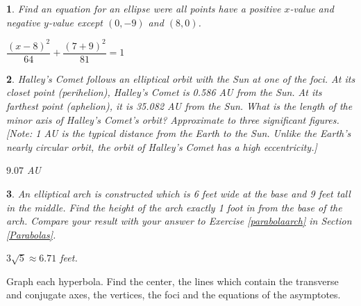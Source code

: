 \documentclass{amsbook}
\newtheorem{exc}{}
\newenvironment{ex}{\begin{exc}\normalfont}{\end{exc}}
\numberwithin{section}{chapter}
\numberwithin{equation}{chapter}
\begin{document}
\begin{ex}
	Find an equation for an ellipse were all points have a positive $x$-value and negative $y$-value \textit{except} $(0,-9)$ and $(8,0)$.
	\begin{sol}
				$\dfrac{(x-8)^2}{64}+\dfrac{(7+9)^2}{81} = 1$
	\end{sol}
\end{ex}



\begin{ex}
Halley's Comet follows an elliptical orbit with the Sun at one of the foci. At its closet point (perihelion), Halley's Comet is 	0.586 AU from the Sun. At its farthest point (aphelion), it is 35.082 AU from the Sun. What is the length of the minor axis of Halley's Comet's orbit? Approximate to three significant figures. [Note: 1 AU is the typical distance from the Earth to the Sun. Unlike the Earth's nearly circular orbit, the orbit of Halley's Comet has a high \textit{eccentricity}.]


\begin{sol}
	$9.07$ AU
\end{sol}
\end{ex}


\begin{ex}
\label{ellipsearchex} An elliptical arch is constructed which is 6 feet wide at the base and 9 feet tall in the middle. Find the height of the arch exactly 1 foot in from the base of the arch. Compare your result with your answer to Exercise \ref{parabolaarch} in Section \ref{Parabolas}.	
	\begin{sol}
		$3\sqrt{5} \approx 6.71$ feet.
	\end{sol}
\end{ex}

Graph each hyperbola. Find the center, the lines which contain the transverse and conjugate axes, the vertices, the foci and the equations of the asymptotes.
\end{document}
